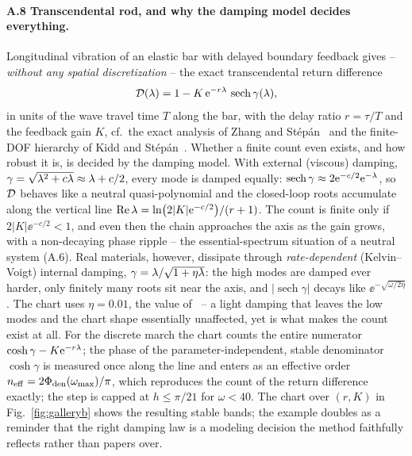 \paragraph{A.8 Transcendental rod, and why the damping model decides
everything.}
Longitudinal vibration of an elastic bar with delayed boundary feedback gives
-- \emph{without any spatial discretization} -- the exact transcendental
return difference
\begin{equation}\label{eq:beam}
  \mathcal{D}(\lambda) = 1 - K\,\mathrm{e}^{-r\lambda}\,\operatorname{sech}\gamma(\lambda),
\end{equation}
in units of the wave travel time $T$ along the bar, with the delay ratio
$r=\tau/T$ and the feedback gain $K$,
cf.\ the exact analysis of Zhang and St\'ep\'an~\cite{zhang2016exact} and the
finite-DOF hierarchy of Kidd and St\'ep\'an~\cite{kidd2014delayed}. Whether a
finite count even exists, and how robust it is, is decided by the damping
model. With external (viscous) damping, $\gamma=\sqrt{\lambda^2+c\lambda}\approx
\lambda+c/2$, every mode is damped equally:
$\operatorname{sech}\gamma\approx2\mathrm{e}^{-c/2}\mathrm{e}^{-\lambda}$, so $\mathcal{D}$
behaves like a neutral quasi-polynomial and the closed-loop roots accumulate
along the vertical line $\operatorname{Re}\lambda=\ln\bigl(2|K|\mathrm{e}^{-c/2}\bigr)/(r+1)$.
The count is finite only if $2|K|\ee^{-c/2}<1$, and even then the chain
approaches the axis as the gain grows, with a non-decaying phase ripple --
the essential-spectrum situation of a neutral system (A.6). Real materials, however, dissipate
through \emph{rate-dependent} (Kelvin--Voigt) internal damping,
$\gamma=\lambda/\sqrt{1+\eta\lambda}$: the high modes are damped ever harder, only
finitely many roots sit near the axis, and $|\operatorname{sech}\gamma|$
decays like $\ee^{-\sqrt{\omega/2\eta}}$. The chart uses $\eta=0.01$, the
value of~\cite{zhang2016exact} -- a light damping that leaves the low modes
and the chart shape essentially unaffected, yet is what makes the count exist
at all. For the discrete march the chart counts the entire numerator
$\cosh\gamma-K\mathrm{e}^{-r\lambda}$; the phase of the parameter-independent, stable
denominator $\cosh\gamma$ is measured once along the line and enters as an
effective order $n_{\mathrm{eff}}=2\Phi_{\mathrm{den}}(\omega_{\mathrm{max}})/\pi$, which
reproduces the count of the return difference exactly; the step is capped at
$h\le\pi/21$ for $\omega<40$. The chart over $(r,K)$ in
Fig.~\ref{fig:galleryb} shows the resulting stable bands;
the example doubles as a reminder that the right damping law is a modeling
decision the method faithfully reflects rather than papers over.


